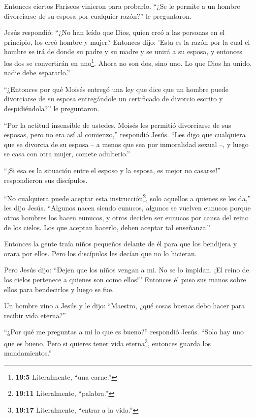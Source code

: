  Entonces ciertos Fariseos vinieron para probarlo. ``¿Se le
permite a un hombre divorciarse de su esposa por cualquier razón?'' le
preguntaron.

 Jesús respondió: ``¿No han leído que Dios, quien creó a las
personas en el principio, los creó hombre y mujer?  Entonces
dijo: 'Esta es la razón por la cual el hombre se irá de donde su padre y
su madre y se unirá a su esposa, y entonces los dos se convertirán en
uno\footnote{\textbf{19:5} Literalmente, ``una carne.''}. 
Ahora no son dos, sino uno. Lo que Dios ha unido, nadie debe
separarlo.''

 ``¿Entonces por qué Moisés entregó una ley que dice que un
hombre puede divorciarse de su esposa entregándole un certificado de
divorcio escrito y despidiéndola?'' le preguntaron.

 ``Por la actitud insensible de ustedes, Moisés les permitió
divorciarse de sus esposas, pero no era así al comienzo,'' respondió
Jesús.  ``Les digo que cualquiera que se divorcia de su
esposa -- a menos que sea por inmoralidad sexual --, y luego se casa con
otra mujer, comete adulterio.''

 ``¡Si esa es la situación entre el esposo y la esposa, es
mejor no casarse!'' respondieron sus discípulos.

 ``No cualquiera puede aceptar esta instrucción\footnote{\textbf{19:11}
  Literalmente, ``palabra.''}, solo aquellos a quienes se les da,'' les
dijo Jesús.  ``Algunos nacen siendo eunucos, algunos se
vuelven eunucos porque otros hombres los hacen eunucos, y otros deciden
ser eunucos por causa del reino de los cielos. Los que aceptan hacerlo,
deben aceptar tal enseñanza.''

 Entonces la gente traía niños pequeños delante de él para
que los bendijera y orara por ellos. Pero los discípulos les decían que
no lo hicieran.

 Pero Jesús dijo: ``Dejen que los niños vengan a mi. No se
lo impidan. ¡El reino de los cielos pertenece a quienes son como
ellos!''  Entonces él puso sus manos sobre ellos para
bendecirlos y luego se fue.

 Un hombre vino a Jesús y le dijo: ``Maestro, ¿qué cosas
buenas debo hacer para recibir vida eterna?''

 ``¿Por qué me preguntas a mi lo que es bueno?'' respondió
Jesús. ``Solo hay uno que es bueno. Pero si quieres tener vida
eterna\footnote{\textbf{19:17} Literalmente, ``entrar a la vida.''},
entonces guarda los mandamientos.''


